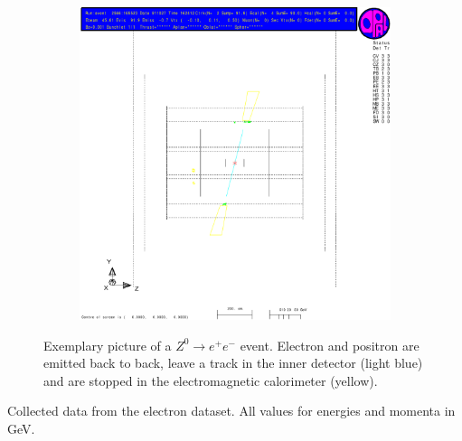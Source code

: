 \documentclass[11pt, a4paper]{article}
\numberwithin{equation}{section}
\begin{document}
\begin{figure}[h]
\ContinuedFloat
	\begin{subfigure}{\textwidth}
		\centering
		\includegraphics[width=.9\textwidth]{./data/tag1/ee_pics/cropped/ee_02_side}
	\end{subfigure}
	\caption{Exemplary picture of a $Z^0\rightarrow e^+e^-$ event. Electron and positron are emitted back to back, leave a track in the inner detector (light blue) and are stopped in the electromagnetic calorimeter (yellow).}
	\label{fig:eventdisplay_ee}
\end{figure}
\begin{table}
	\centering
	
	\caption{Collected data from the electron dataset. All values for energies and momenta in \si{GeV}.}
	\label{tab:eventdisplay_ee}
\end{table}
\clearpage
\end{document}
